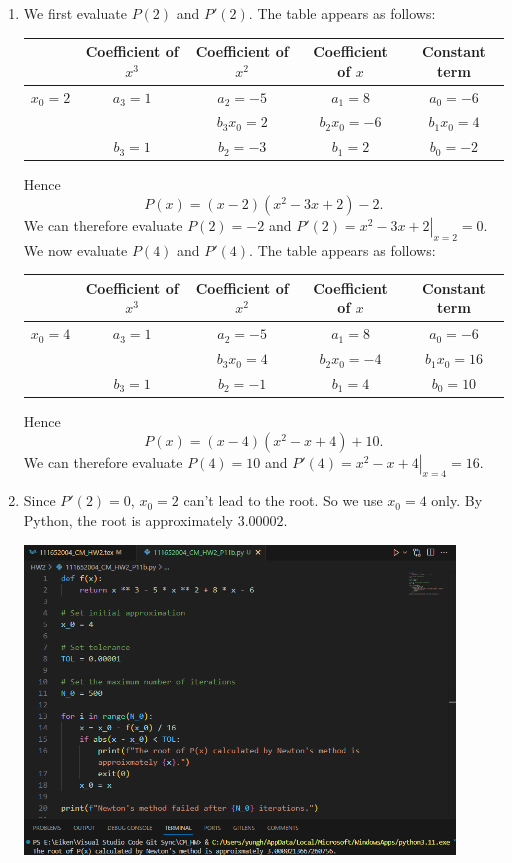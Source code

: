 \documentclass[11pt]{article}
\theoremstyle{break}
\numberwithin{equation}{theorem}
\begin{document}
\begin{enumerate}
    \item We first evaluate $P(2)$ and $P'(2)$. The table appears as follows:
    \begin{center}
        \begin{tabular}{|c|c|c|c|c|}
            \hline
            & Coefficient of $x^3$ & Coefficient of $x^2$ & Coefficient of $x$ & Constant term \\
            \hline
            $x_0=2$ & $a_3=1$ & $a_2=-5$ & $a_1=8$ & $a_0=-6$\\
            \hline
            &  & $b_3x_0=2$ & $b_2x_0=-6$ & $b_1x_0=4$\\
            \hline
            & $b_3=1$ & $b_2=-3$ & $b_1=2$ & $b_0=-2$\\
            \hline
        \end{tabular}
    \end{center}
    Hence $$P(x)=(x-2)(x^2-3x+2)-2.$$ We can therefore evaluate $P(2)=-2$ and $P'(2)=\left.x^2-3x+2\right|_{x=2}=0$. We now evaluate $P(4)$ and $P'(4)$. The table appears as follows:
    \begin{center}
        \begin{tabular}{|c|c|c|c|c|}
            \hline
            & Coefficient of $x^3$ & Coefficient of $x^2$ & Coefficient of $x$ & Constant term \\
            \hline
            $x_0=4$ & $a_3=1$ & $a_2=-5$ & $a_1=8$ & $a_0=-6$\\
            \hline
            &  & $b_3x_0=4$ & $b_2x_0=-4$ & $b_1x_0=16$\\
            \hline
            & $b_3=1$ & $b_2=-1$ & $b_1=4$ & $b_0=10$\\
            \hline
        \end{tabular}
    \end{center}
    Hence $$P(x)=(x-4)(x^2-x+4)+10.$$ We can therefore evaluate $P(4)=10$ and $P'(4)=\left.x^2-x+4\right|_{x=4}=16$.
    \item Since $P'(2)=0$, $x_0=2$ can't lead to the root. So we use $x_0=4$ only. By Python, the root is approximately $3.00002$.
    \begin{center}
        \includegraphics[width=0.9\textwidth]{problem_11b_py.png}

\end{center}
\end{enumerate}
\end{document}
